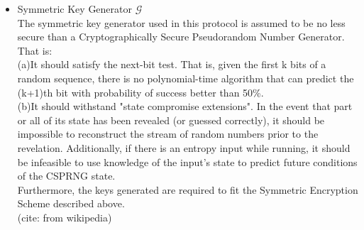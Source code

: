 \documentclass[10pt,a4paper]{article}
\begin{document}
\begin{itemize}
\item Symmetric Key Generator $\mathcal{G}$\\
The symmetric key generator used in this protocol is assumed to be no less secure than a Cryptographically Secure Pseudorandom Number Generator. That is: \\
(a)It should satisfy the next-bit test. That is, given the first k bits of a random sequence, there is no polynomial-time algorithm that can predict the (k+1)th bit with probability of success better than 50\%. \\
(b)It should withstand "state compromise extensions". In the event that part or all of its state has been revealed (or guessed correctly), it should be impossible to reconstruct the stream of random numbers prior to the revelation. Additionally, if there is an entropy input while running, it should be infeasible to use knowledge of the input's state to predict future conditions of the CSPRNG state.\\
Furthermore, the keys generated are required to fit the Symmetric Encryption Scheme described above.
\\
(cite: from wikipedia)
\end{itemize}
\end{document}
